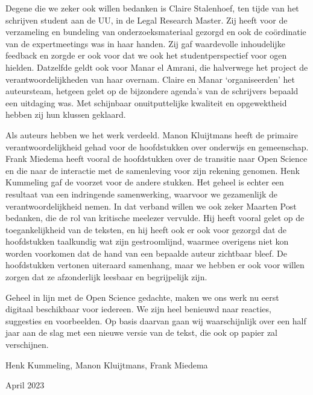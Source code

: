 \documentclass[empirical, authordate, ]{new-jote-article}
\begin{document}
	Degene die we zeker ook willen bedanken is Claire Stalenhoef, ten tijde van het schrijven student aan de UU, in de Legal Research Master. Zij heeft voor de verzameling en bundeling van onderzoeksmateriaal gezorgd en ook de coördinatie van de expertmeetings was in haar handen. Zij gaf waardevolle inhoudelijke feedback en zorgde er ook voor dat we ook het studentperspectief voor ogen hielden. Datzelfde geldt ook voor Manar el Amrani, die halverwege het project de verantwoordelijkheden van haar overnam. Claire en Manar ‘organiseerden' het auteursteam, hetgeen gelet op de bijzondere agenda's van de schrijvers bepaald een uitdaging was. Met schijnbaar onuitputtelijke kwaliteit en opgewektheid hebben zij hun klussen geklaard.



	Als auteurs hebben we het werk verdeeld. Manon Kluijtmans heeft de primaire verantwoordelijkheid gehad voor de hoofdstukken over onderwijs en gemeenschap. Frank Miedema heeft vooral de hoofdstukken over de transitie naar Open Science en die naar de interactie met de samenleving voor zijn rekening genomen. Henk Kummeling gaf de voorzet voor de andere stukken. Het geheel is echter een resultaat van een indringende samenwerking, waarvoor we gezamenlijk de verantwoordelijkheid nemen. In dat verband willen we ook zeker Maarten Post bedanken, die de rol van kritische meelezer vervulde. Hij heeft vooral gelet op de toegankelijkheid van de teksten, en hij heeft ook er ook voor gezorgd dat de hoofdstukken taalkundig wat zijn gestroomlijnd, waarmee overigens niet kon worden voorkomen dat de hand van een bepaalde auteur zichtbaar bleef. De hoofdstukken vertonen uiteraard samenhang, maar we hebben er ook voor willen zorgen dat ze afzonderlijk leesbaar en begrijpelijk zijn.



	Geheel in lijn met de Open Science gedachte, maken we ons werk nu eerst digitaal beschikbaar voor iedereen. We zijn heel benieuwd naar reacties, suggesties en voorbeelden. Op basis daarvan gaan wij waarschijnlijk over een half jaar aan de slag met een nieuwe versie van de tekst, die ook op papier zal verschijnen.







	Henk Kummeling, Manon Kluijtmans, Frank Miedema



	April 2023
\end{document}
